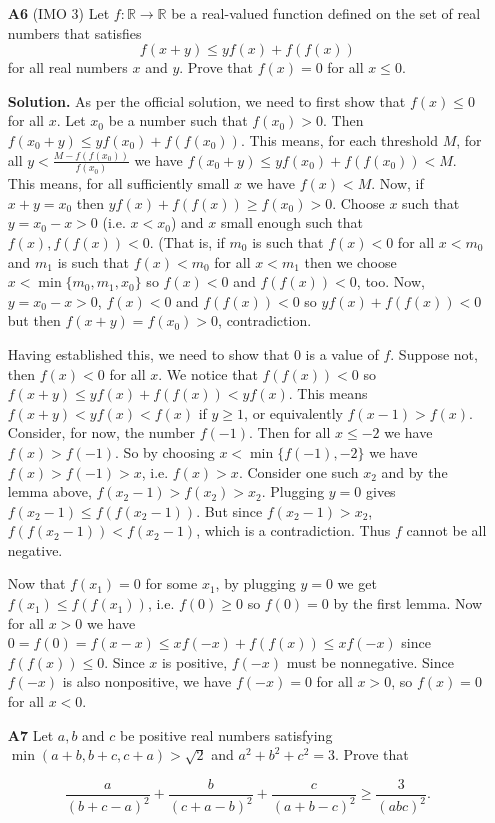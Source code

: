 \documentclass[11pt,a4paper]{article}
\begin{document}
\begin{enumerate}
	\item[\textbf{A6}] (IMO 3) Let $f : \mathbb R \to \mathbb R$ be a real-valued function defined on the set of real numbers that satisfies
	\[f(x + y) \leq yf(x) + f(f(x))\]
	for all real numbers $x$ and $y$. Prove that $f(x) = 0$ for all $x \leq 0$.
	
	\textbf{Solution.} As per the official solution, we need to first show that $f(x)\le 0$ for all $x$. 
	Let $x_0$ be a number such that $f(x_0)>0$. Then $f(x_0+y)\le yf(x_0)+f(f(x_0))$. 
	This means, for each threshold $M$, for all $y<\frac{M-f(f(x_0))}{f(x_0)}$ we have $f(x_0+y)\le yf(x_0)+f(f(x_0))<M$. This means, for all sufficiently small $x$ we have $f(x)<M$. 
	Now, if $x+y=x_0$ then $yf(x) + f(f(x))\ge f(x_0)>0$. 
	Choose $x$ such that $y=x_0-x>0$ (i.e. $x<x_0$) and $x$ small enough such that $f(x), f(f(x))<0$. 
	(That is, if $m_0$ is such that $f(x)<0$ for all $x<m_0$ and $m_1$ is such that $f(x)<m_0$ for all $x<m_1$ then we choose $x<\min\{m_0, m_1, x_0\}$ so $f(x)<0$ and $f(f(x))<0$, too. 
	Now, $y=x_0-x>0$, $f(x)<0$ and $f(f(x))<0$ so $yf(x)+f(f(x))<0$ but then $f(x+y)=f(x_0)>0$, contradiction. 
	
	Having established this, we need to show that 0 is a value of $f$. Suppose not, then $f(x)<0$ for all $x$. 
	We notice that $f(f(x))< 0$ so $f(x+y)\le yf(x)+f(f(x))< yf(x)$. 
	This means $f(x+y)<yf(x)<f(x)$ if $y\ge 1$, or equivalently $f(x-1)>f(x)$. Consider, for now, the number $f(-1)$. Then for all $x\le -2$ we have $f(x)>f(-1)$. So by choosing $x<\min\{f(-1), -2\}$ we have $f(x)>f(-1)>x$, i.e. $f(x)>x$. 
	Consider one such $x_2$ and by the lemma above, $f(x_2-1)>f(x_2)>x_2$. 
	Plugging $y=0$ gives $f(x_2-1)\le f(f(x_2-1))$. But since $f(x_2-1)>x_2$, $f(f(x_2-1))<f(x_2-1)$, which is a contradiction. Thus $f$ cannot be all negative. 
	
	Now that $f(x_1)=0$ for some $x_1$, by plugging $y=0$ we get $f(x_1)\le f(f(x_1))$, i.e. $f(0)\ge 0$ so $f(0)=0$ by the first lemma. Now for all $x>0$ we have $0=f(0)=f(x-x)\le xf(-x)+f(f(x))\le xf(-x)$ since $f(f(x))\le 0$. Since $x$ is positive, $f(-x)$ must be nonnegative. Since $f(-x)$ is also nonpositive, we have $f(-x)=0$ for all $x>0$, so $f(x)=0$ for all $x<0$. 
	
	\item [\textbf{A7}] Let $a,b$ and $c$ be positive real numbers satisfying $\min(a+b,b+c,c+a) > \sqrt{2}$ and $a^2+b^2+c^2=3.$ Prove that
	
	\[\frac{a}{(b+c-a)^2} + \frac{b}{(c+a-b)^2} + \frac{c}{(a+b-c)^2} \geq \frac{3}{(abc)^2}.\]
	

\end{enumerate}
\end{document}
